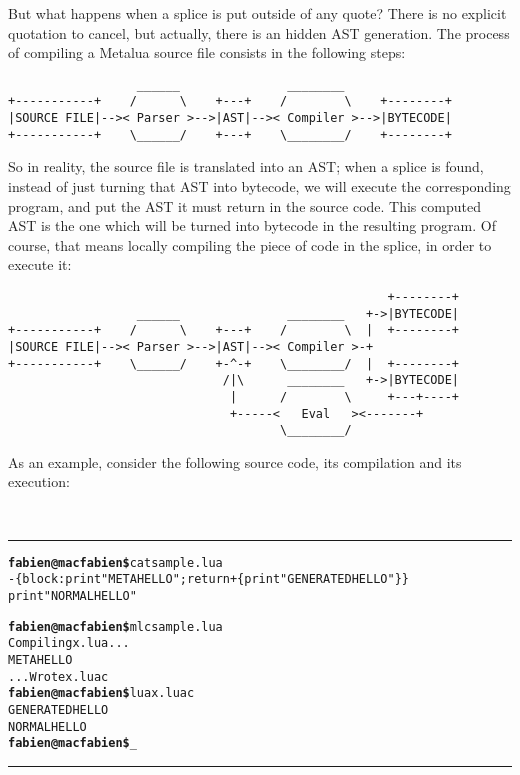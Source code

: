 But what happens when a splice is put outside of any quote? There is
no explicit quotation to cancel, but actually, there is an hidden AST
generation. The process of compiling a Metalua source file consists in
the following steps:

\begin{verbatim}
                  ______               ________
+-----------+    /      \    +---+    /        \    +--------+
|SOURCE FILE|-->< Parser >-->|AST|-->< Compiler >-->|BYTECODE|  
+-----------+    \______/    +---+    \________/    +--------+

\end{verbatim}

So in reality, the source file is translated into an AST; when a
splice is found, instead of just turning that AST into bytecode, we
will execute the corresponding program, and put the AST it must return
in the source code. This computed AST is the one which will be turned
into bytecode in the resulting program. Of course, that means locally
compiling the piece of code in the splice, in order to execute it:

\begin{verbatim}
                                                     +--------+
                  ______               ________   +->|BYTECODE|  
+-----------+    /      \    +---+    /        \  |  +--------+
|SOURCE FILE|-->< Parser >-->|AST|-->< Compiler >-+
+-----------+    \______/    +-^-+    \________/  |  +--------+
                              /|\      ________   +->|BYTECODE|  
                               |      /        \     +---+----+
                               +-----<   Eval   ><-------+
                                      \________/
\end{verbatim}

As an example, consider the following source code, its compilation and
its execution:

\def\braces#1{\{#1\}}
~\\\hrule
\begin{alltt}
{\bf{}fabien@macfabien\$} cat sample.lua
-\braces{block: print "META HELLO"; return +\braces{ print "GENERATED HELLO" } }
print "NORMAL HELLO"

{\bf{}fabien@macfabien\$} mlc sample.lua
Compiling x.lua...
META HELLO
...Wrote x.luac
{\bf{}fabien@macfabien\$} lua x.luac
GENERATED HELLO
NORMAL HELLO
{\bf{}fabien@macfabien\$} _
\end{alltt}
\hrule~\\

